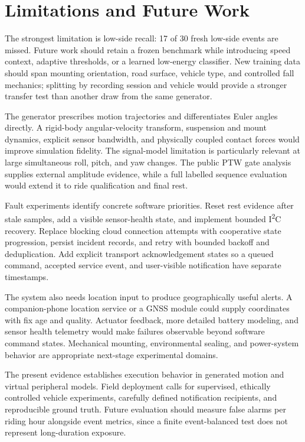 \documentclass[10pt,a4paper]{article}
\begin{document}
\section{Limitations and Future Work}
The strongest limitation is low-side recall: 17 of 30 fresh low-side events are missed. Future work should retain a frozen benchmark while introducing speed context, adaptive thresholds, or a learned low-energy classifier. New training data should span mounting orientation, road surface, vehicle type, and controlled fall mechanics; splitting by recording session and vehicle would provide a stronger transfer test than another draw from the same generator.

The generator prescribes motion trajectories and differentiates Euler angles directly. A rigid-body angular-velocity transform, suspension and mount dynamics, explicit sensor bandwidth, and physically coupled contact forces would improve simulation fidelity. The signal-model limitation is particularly relevant at large simultaneous roll, pitch, and yaw changes. The public PTW gate analysis supplies external amplitude evidence, while a full labelled sequence evaluation would extend it to ride qualification and final rest.

Fault experiments identify concrete software priorities. Reset rest evidence after stale samples, add a visible sensor-health state, and implement bounded I\textsuperscript{2}C recovery. Replace blocking cloud connection attempts with cooperative state progression, persist incident records, and retry with bounded backoff and deduplication. Add explicit transport acknowledgement states so a queued command, accepted service event, and user-visible notification have separate timestamps.

The system also needs location input to produce geographically useful alerts. A companion-phone location service or a GNSS module could supply coordinates with fix age and quality. Actuator feedback, more detailed battery modeling, and sensor health telemetry would make failures observable beyond software command states. Mechanical mounting, environmental sealing, and power-system behavior are appropriate next-stage experimental domains.

The present evidence establishes execution behavior in generated motion and virtual peripheral models. Field deployment calls for supervised, ethically controlled vehicle experiments, carefully defined notification recipients, and reproducible ground truth. Future evaluation should measure false alarms per riding hour alongside event metrics, since a finite event-balanced test does not represent long-duration exposure.
\end{document}

